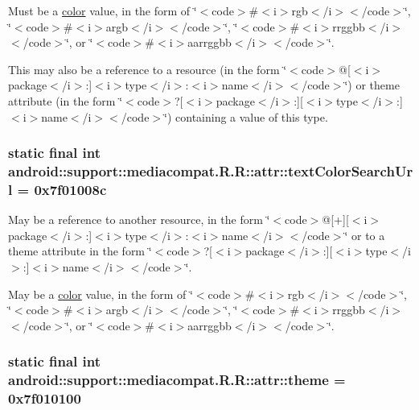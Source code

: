 Must be a \hyperlink{classandroid_1_1support_1_1mediacompat_1_1_r_1_1color}{color} value, in the form of \char`\"{}$<$code$>$\#$<$i$>$rgb$<$/i$>$$<$/code$>$\char`\"{}, \char`\"{}$<$code$>$\#$<$i$>$argb$<$/i$>$$<$/code$>$\char`\"{}, \char`\"{}$<$code$>$\#$<$i$>$rrggbb$<$/i$>$$<$/code$>$\char`\"{}, or \char`\"{}$<$code$>$\#$<$i$>$aarrggbb$<$/i$>$$<$/code$>$\char`\"{}. 

This may also be a reference to a resource (in the form \char`\"{}$<$code$>$@\mbox{[}$<$i$>$package$<$/i$>$:\mbox{]}$<$i$>$type$<$/i$>$:$<$i$>$name$<$/i$>$$<$/code$>$\char`\"{}) or theme attribute (in the form \char`\"{}$<$code$>$?\mbox{[}$<$i$>$package$<$/i$>$:\mbox{]}\mbox{[}$<$i$>$type$<$/i$>$:\mbox{]}$<$i$>$name$<$/i$>$$<$/code$>$\char`\"{}) containing a value of this type. \hypertarget{classandroid_1_1support_1_1mediacompat_1_1_r_1_1attr_8e7f9c1cd4e499d0b296e2f85519dde0}{
\subsubsection[{textColorSearchUrl}]{\setlength{\rightskip}{0pt plus 5cm}static final int android::support::mediacompat.R.R::attr::textColorSearchUrl = 0x7f01008c}}
\label{classandroid_1_1support_1_1mediacompat_1_1_r_1_1attr_8e7f9c1cd4e499d0b296e2f85519dde0}


May be a reference to another resource, in the form \char`\"{}$<$code$>$@\mbox{[}+\mbox{]}\mbox{[}$<$i$>$package$<$/i$>$:\mbox{]}$<$i$>$type$<$/i$>$:$<$i$>$name$<$/i$>$$<$/code$>$\char`\"{} or to a theme attribute in the form \char`\"{}$<$code$>$?\mbox{[}$<$i$>$package$<$/i$>$:\mbox{]}\mbox{[}$<$i$>$type$<$/i$>$:\mbox{]}$<$i$>$name$<$/i$>$$<$/code$>$\char`\"{}. 

May be a \hyperlink{classandroid_1_1support_1_1mediacompat_1_1_r_1_1color}{color} value, in the form of \char`\"{}$<$code$>$\#$<$i$>$rgb$<$/i$>$$<$/code$>$\char`\"{}, \char`\"{}$<$code$>$\#$<$i$>$argb$<$/i$>$$<$/code$>$\char`\"{}, \char`\"{}$<$code$>$\#$<$i$>$rrggbb$<$/i$>$$<$/code$>$\char`\"{}, or \char`\"{}$<$code$>$\#$<$i$>$aarrggbb$<$/i$>$$<$/code$>$\char`\"{}. \hypertarget{classandroid_1_1support_1_1mediacompat_1_1_r_1_1attr_dcdff606909ca42788f82e60939a80fd}{
\subsubsection[{theme}]{\setlength{\rightskip}{0pt plus 5cm}static final int android::support::mediacompat.R.R::attr::theme = 0x7f010100}}
\label{classandroid_1_1support_1_1mediacompat_1_1_r_1_1attr_dcdff606909ca42788f82e60939a80fd}



